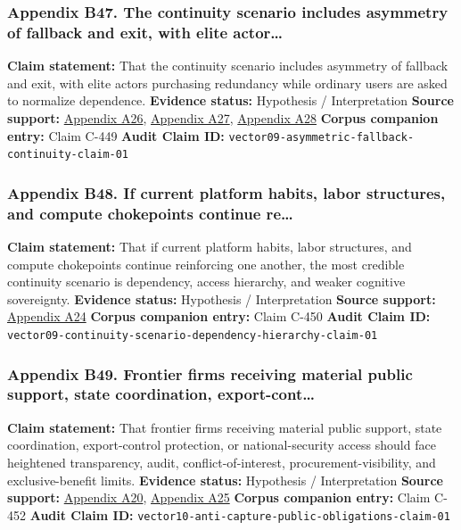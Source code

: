 \documentclass[
  american,
  11pt,
  letterpaper,
]{article}
\begin{document}
\subsubsection{Appendix B47. The continuity scenario includes asymmetry
of fallback and exit, with elite
actor\ldots{}}\label{ch-10-appendix-b47-the-continuity-scenario-includes-asymmetry-of-fallback-and-exit-with-elite-actor}

\textbf{Claim statement:} That the continuity scenario includes
asymmetry of fallback and exit, with elite actors purchasing redundancy
while ordinary users are asked to normalize dependence. \textbf{Evidence
status:} Hypothesis / Interpretation \textbf{Source support:}
\hyperref[ch-10-appendix-a26-sam-altman-s-manifest-destiny]{Appendix
A26},
\hyperref[ch-10-appendix-a27-inside-mark-zuckerbergs-top-secret-hawaii-compound]{Appendix
A27},
\hyperref[ch-10-appendix-a28-new-zealand-woos-the-wealthy-with-golden-visa-changes]{Appendix
A28} \textbf{Corpus companion entry:} Claim C-449 \textbf{Audit Claim
ID:} \texttt{vector09-asymmetric-fallback-continuity-claim-01}

\subsubsection{Appendix B48. If current platform habits, labor
structures, and compute chokepoints continue
re\ldots{}}\label{ch-10-appendix-b48-if-current-platform-habits-labor-structures-and-compute-chokepoints-continue-re}

\textbf{Claim statement:} That if current platform habits, labor
structures, and compute chokepoints continue reinforcing one another,
the most credible continuity scenario is dependency, access hierarchy,
and weaker cognitive sovereignty. \textbf{Evidence status:} Hypothesis /
Interpretation \textbf{Source support:}
\hyperref[ch-10-appendix-a24-the-adolescence-of-technology]{Appendix
A24} \textbf{Corpus companion entry:} Claim C-450 \textbf{Audit Claim
ID:} \texttt{vector09-continuity-scenario-dependency-hierarchy-claim-01}

\subsubsection{Appendix B49. Frontier firms receiving material public
support, state coordination,
export-cont\ldots{}}\label{ch-10-appendix-b49-frontier-firms-receiving-material-public-support-state-coordination-export-cont}

\textbf{Claim statement:} That frontier firms receiving material public
support, state coordination, export-control protection, or
national-security access should face heightened transparency, audit,
conflict-of-interest, procurement-visibility, and exclusive-benefit
limits. \textbf{Evidence status:} Hypothesis / Interpretation
\textbf{Source support:}
\hyperref[ch-10-appendix-a20-openais-proposals-for-the-us-ai-action-plan]{Appendix
A20},
\hyperref[ch-10-appendix-a25-ftc-opens-inquiry-into-big-tech-s-partnerships-with-leading-ai-startups]{Appendix
A25} \textbf{Corpus companion entry:} Claim C-452 \textbf{Audit Claim
ID:} \texttt{vector10-anti-capture-public-obligations-claim-01}
\end{document}
